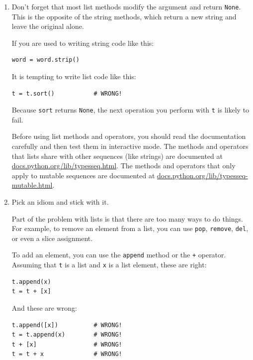 \documentclass[10pt]{book}
\begin{document}
\begin{enumerate}

\item Don't forget that most list methods modify the argument and
  return {\tt None}.  This is the opposite of the string methods,
  which return a new string and leave the original alone.

If you are used to writing string code like this:

\beforeverb
\begin{verbatim}
word = word.strip()
\end{verbatim}
\afterverb

It is tempting to write list code like this:

\beforeverb
\begin{verbatim}
t = t.sort()           # WRONG!
\end{verbatim}
\afterverb


Because {\tt sort} returns {\tt None}, the
next operation you perform with {\tt t} is likely to fail.

Before using list methods and operators, you should read the
documentation carefully and then test them in interactive mode.  The
methods and operators that lists share with other sequences (like
strings) are documented at
\url{docs.python.org/lib/typesseq.html}.  The
methods and operators that only apply to mutable sequences
are documented at \url{docs.python.org/lib/typesseq-mutable.html}.


\item Pick an idiom and stick with it.

Part of the problem with lists is that there are too many
ways to do things.  For example, to remove an element from
a list, you can use {\tt pop}, {\tt remove}, {\tt del},
or even a slice assignment.

To add an element, you can use the {\tt append} method or
the {\tt +} operator.  Assuming that {\tt t} is a list and
{\tt x} is a list element, these are right: 

\beforeverb
\begin{verbatim}
t.append(x)
t = t + [x]
\end{verbatim}
\afterverb

And these are wrong:

\beforeverb
\begin{verbatim}
t.append([x])          # WRONG!
t = t.append(x)        # WRONG!
t + [x]                # WRONG!
t = t + x              # WRONG!
\end{verbatim}
\afterverb


\end{enumerate}
\end{document}
